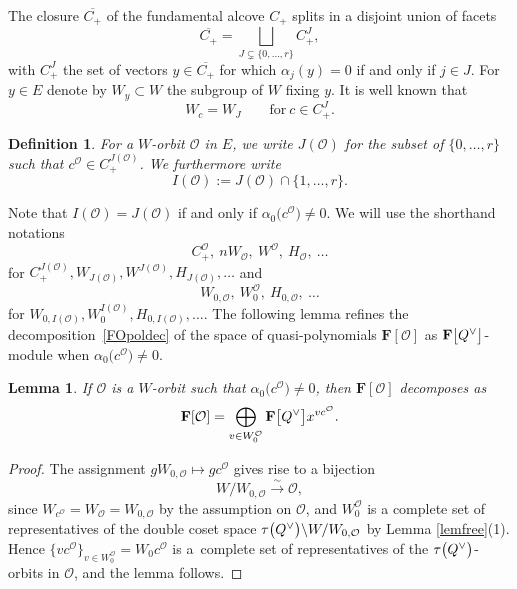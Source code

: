 \documentclass[11pt]{article}
\numberwithin{equation}{section}
\numberwithin{equation}{section}
\newtheorem{Lemma}[Theorem]{Lemma}
\newtheorem{Definition}[Theorem]{Definition}
\begin{document}
The closure $\overline{C_+}$ of the fundamental alcove $C_+$ splits in a disjoint union of facets
\begin{equation*}%
\overline{C_+}=\bigsqcup_{J\subsetneq \{0,\dots,r\}}C_+^J,
\end{equation*}
with $C_+^J$ the set of vectors $y\in\overline{C_+}$ for which $\alpha_j(y)=0$ if and only if $j\in J$.
For $y\in E$ denote by $W_y\subset W$ the subgroup of $W$ fixing $y$. It is well known that
\[
W_c=W_J\qquad \text{for}\ c\in C_+^J.
\]

\begin{Definition}\label{IJ}
For a $W$-orbit $\mathcal{O}$ in $E$, we write
$J(\mathcal{O})$ for the subset of $\{0,\dots,r\}$ such that $c^\mathcal{O}\in C_+^{J(\mathcal{O})}$. We furthermore write
\begin{equation*}%
I(\mathcal{O}):=J(\mathcal{O})\cap\{1,\dots,r\}.
\end{equation*}
\end{Definition}

Note that $I(\mathcal{O})=J(\mathcal{O})$ if and only if $\alpha_0\bigl(c^\mathcal{O}\bigr)\not=0$.
We will use the shorthand notations
\[
C_+^\mathcal{O},\ nW_\mathcal{O},\ W^\mathcal{O},\ H_\mathcal{O}, \ \dots
\]
for $C_+^{J(\mathcal{O})},W_{J(\mathcal{O})}, W^{J(\mathcal{O})}, H_{J(\mathcal{O})},\dots$ and
\[
W_{0,\mathcal{O}},\ W^{\mathcal{O}}_0,\ H_{0,\mathcal{O}},\ \dots
\]
for $W_{0,I(\mathcal{O})}, W_0^{I(\mathcal{O})}, H_{0,I(\mathcal{O})},\dots$.
The following lemma refines the decomposition~\eqref{FOpoldec} of the space of quasi-polynomials $\mathbf{F}[\mathcal{O}]$ as $\mathbf{F}\smash{\bigl[Q^\vee\bigr]}$-module when
$\alpha_0\bigl(c^\mathcal{O}\bigr)\not=0$.
\begin{Lemma}\label{Pcpoldec}
If $\mathcal{O}$ is a $W$-orbit such that $\alpha_0\bigl(c^\mathcal{O}\bigr)\not=0$, then
$\mathbf{F}[\mathcal{O}]$ decomposes as
\begin{equation}\label{FpoldecI}
\mathbf{F}[\mathcal{O}]=\bigoplus_{v\in W_0^\mathcal{O}}\mathbf{F}\smash{\bigl[Q^\vee\bigr]}x^{vc^\mathcal{O}}.
\end{equation}
\end{Lemma}
\begin{proof}
The assignment $gW_{0,\mathcal{O}}\mapsto gc^\mathcal{O}$ gives rise to a bijection
\[
W/W_{0,\mathcal{O}}\overset{\sim}{\longrightarrow}\mathcal{O},
\]
since $W_{c^\mathcal{O}}=W_{\mathcal{O}}=W_{0,\mathcal{O}}$ by the assumption on $\mathcal{O}$, and $W_0^{\mathcal{O}}$ is a complete set of representatives of the double coset space $\tau\smash{\bigl(Q^\vee\bigr)}\backslash W/W_{0,\mathcal{O}}$ by Lemma
\ref{lemfree}(1).
Hence $\{vc^\mathcal{O}\}_{v\in W_0^{\mathcal{O}}}=W_0c^\mathcal{O}$ is a~complete set of representatives of the $\tau\smash{\bigl(Q^\vee\bigr)}$-orbits in $\mathcal{O}$, and the lemma follows.
\end{proof}
\end{document}

